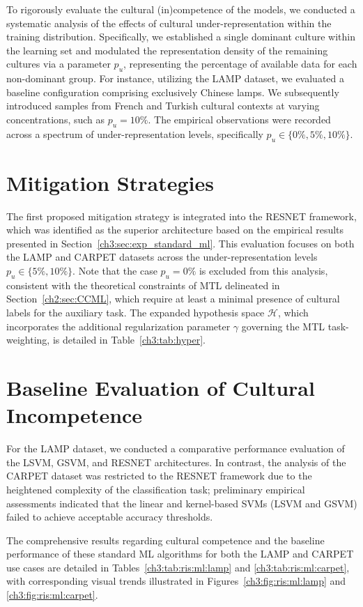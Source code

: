 %
To rigorously evaluate the cultural (in)competence of the models, we conducted a systematic analysis of the effects of cultural under-representation within the training distribution.
Specifically, we established a single dominant culture within the learning set and modulated the representation density of the remaining cultures via a parameter $p_u$, representing the percentage of available data for each non-dominant group. For instance, utilizing the LAMP dataset, we evaluated a baseline configuration comprising exclusively Chinese lamps. 
We subsequently introduced samples from French and Turkish cultural contexts at varying concentrations, such as $p_u = 10\%$.
The empirical observations were recorded across a spectrum of under-representation levels, specifically $p_u \in \{0\%, 5\%, 10\%\}$.
%

\section{Mitigation Strategies}
The first proposed mitigation strategy is integrated into the RESNET framework, which was identified as the superior architecture based on the empirical results presented in Section~\ref{ch3:sec:exp_standard_ml}. 
This evaluation focuses on both the LAMP and CARPET datasets across the under-representation levels $p_u \in \{5\%, 10\%\}$. 
Note that the case $p_u = 0\%$ is excluded from this analysis, consistent with the theoretical constraints of MTL delineated in Section~\ref{ch2:sec:CCML}, which require at least a minimal presence of cultural labels for the auxiliary task.
The expanded hypothesis space $\mathcal{H}$, which incorporates the additional regularization parameter $\gamma$ governing the MTL task-weighting, is detailed in Table~\ref{ch3:tab:hyper}.
%

\section{Baseline Evaluation of Cultural Incompetence}

For the LAMP dataset, we conducted a comparative performance evaluation of the LSVM, GSVM, and RESNET architectures. 
In contrast, the analysis of the CARPET dataset was restricted to the RESNET framework due to the heightened complexity of the classification task; preliminary empirical assessments indicated that the linear and kernel-based SVMs (LSVM and GSVM) failed to achieve acceptable accuracy thresholds.

The comprehensive results regarding cultural competence and the baseline performance of these standard ML algorithms for both the LAMP and CARPET use cases are detailed in Tables~\ref{ch3:tab:ris:ml:lamp} and \ref{ch3:tab:ris:ml:carpet}, with corresponding visual trends illustrated in Figures~\ref{ch3:fig:ris:ml:lamp} and \ref{ch3:fig:ris:ml:carpet}.

